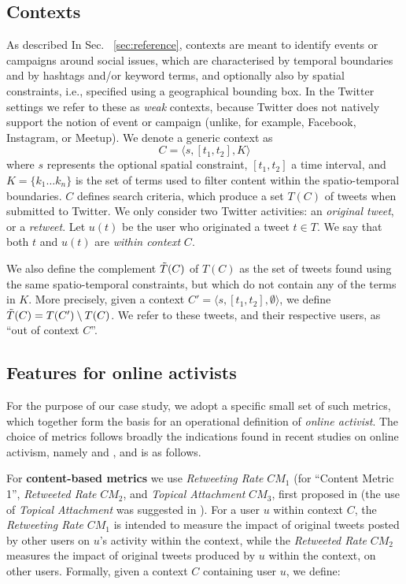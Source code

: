 \documentclass[runningheads]{llncs}
\begin{document}
\subsection{Contexts} \label{sec:contexts}

As described In Sec. ~\ref{sec:reference}, contexts are meant to identify events or campaigns around social issues, which are characterised by temporal boundaries and by hashtags and/or keyword terms, and optionally also by spatial constraints, i.e., specified using a geographical bounding box.
In the Twitter settings we refer to these as \textit{weak} contexts, because Twitter does not natively support the notion of event or campaign (unlike, for example, Facebook, Instagram, or Meetup).
We  denote a generic context as
\begin{equation}
    C = \langle s, [t_1, t_2], K \rangle 
    \label{eq:context}
\end{equation}
where  $s$ represents the optional spatial constraint, $[t_1, t_2]$ a time interval, and $K = \{ k_1 \dots k_n\}$ is the set of terms used to filter content within the spatio-temporal boundaries.
%
$C$ defines search criteria, which produce a set $T(C)$ of tweets when submitted to Twitter.
We only consider two Twitter activities: an \textit{original tweet}, or a \textit{retweet}.
Let $u(t)$ be the user who originated a tweet $t \in T$.
We say that both $t$ and  $u(t)$ are \textit{within context} $C$.

We also define the complement $\Tilde{T}(C)$ of $T(C)$ as the set of tweets found using the same spatio-temporal constraints, but which do not contain any of the terms in $K$. More precisely, given a  context $C'= \langle s, [t_1, t_2], \emptyset \rangle$, we define $\Tilde{T}(C) = T(C') \setminus T(C)$. 
We refer to these tweets, and their respective users, as ``out of context $C$''.

\subsection{Features  for online activists}

For the purpose of our case study, we adopt a specific small set of such metrics, which together form   the basis for an operational definition of \textit{online activist}.
The choice of metrics follows broadly the indications found in recent studies on online activism, namely \cite{Lotan2011} and  \cite{Poell2014}, and is as follows.

For \textbf{content-based metrics} we use  \textit{Retweeting Rate} $CM_1$ (for ``Content Metric 1'', \textit{Retweeted Rate} $CM_2$, and  \textit{Topical Attachment}  $CM_3$, first proposed in \cite{Bizid:2015} (the use of \textit{Topical Attachment} was suggested in \cite{Poell2014}).
%
For a user $u$ within context $C$, the \textit{Retweeting Rate}  $CM_1$ is intended to measure the impact of  original tweets posted  by other users on $u$'s activity within the context, while the \textit{Retweeted Rate} $CM_2$  measures the impact of original tweets produced by $u$ within the context, on other users.
Formally, given a context $C$ containing user $u$, we define:
\end{document}
